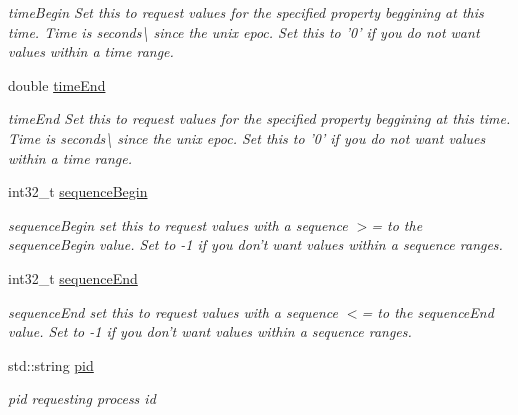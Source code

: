 \begin{DoxyCompactItemize}
\begin{DoxyCompactList}\small\item\em time\+Begin Set this to request values for the specified property beggining at this time. Time is seconds\textbackslash{} since the unix epoc. Set this to '0' if you do not want values within a time range. \end{DoxyCompactList}\item 
\hypertarget{classAsyncRangePropertyRequest_acd2a28137c227b0fb6a51576d84f5f30}{double \hyperlink{classAsyncRangePropertyRequest_acd2a28137c227b0fb6a51576d84f5f30}{time\+End}}\label{classAsyncRangePropertyRequest_acd2a28137c227b0fb6a51576d84f5f30}

\begin{DoxyCompactList}\small\item\em time\+End Set this to request values for the specified property beggining at this time. Time is seconds\textbackslash{} since the unix epoc. Set this to '0' if you do not want values within a time range. \end{DoxyCompactList}\item 
\hypertarget{classAsyncRangePropertyRequest_a024dab8e12c45ea8988b7f3e4b3c85c0}{int32\+\_\+t \hyperlink{classAsyncRangePropertyRequest_a024dab8e12c45ea8988b7f3e4b3c85c0}{sequence\+Begin}}\label{classAsyncRangePropertyRequest_a024dab8e12c45ea8988b7f3e4b3c85c0}

\begin{DoxyCompactList}\small\item\em sequence\+Begin set this to request values with a sequence $>$= to the sequence\+Begin value. Set to -\/1 if you don't want values within a sequence ranges. \end{DoxyCompactList}\item 
\hypertarget{classAsyncRangePropertyRequest_a352afdecef1d1e6fc1f82384d0c9edfe}{int32\+\_\+t \hyperlink{classAsyncRangePropertyRequest_a352afdecef1d1e6fc1f82384d0c9edfe}{sequence\+End}}\label{classAsyncRangePropertyRequest_a352afdecef1d1e6fc1f82384d0c9edfe}

\begin{DoxyCompactList}\small\item\em sequence\+End set this to request values with a sequence $<$= to the sequence\+End value. Set to -\/1 if you don't want values within a sequence ranges. \end{DoxyCompactList}\item 
\hypertarget{classAsyncRangePropertyRequest_ab93b9cc82ead929a6e1f72be699fbb6c}{std\+::string \hyperlink{classAsyncRangePropertyRequest_ab93b9cc82ead929a6e1f72be699fbb6c}{pid}}\label{classAsyncRangePropertyRequest_ab93b9cc82ead929a6e1f72be699fbb6c}

\begin{DoxyCompactList}\small\item\em pid requesting process id \end{DoxyCompactList}\end{DoxyCompactItemize}


